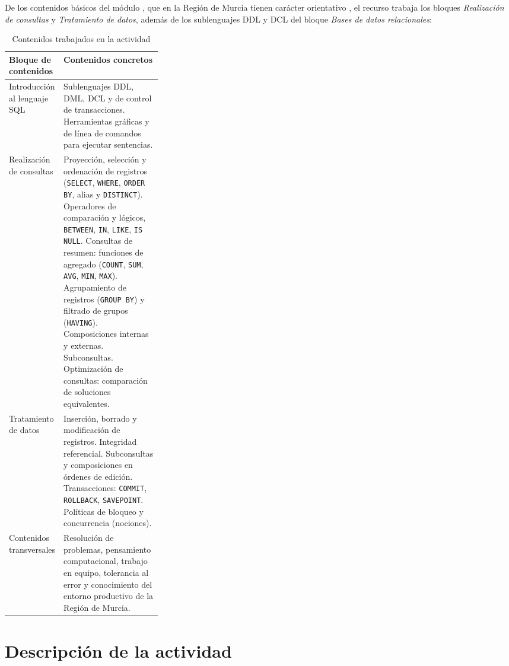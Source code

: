 \documentclass[11pt,a4paper]{article}
\begin{document}
De los contenidos básicos del módulo \cite{rd405}, que en la Región de Murcia tienen carácter
orientativo \cite[art.~3]{murcia2026}, el recurso trabaja los bloques \emph{Realización de
consultas} y \emph{Tratamiento de datos}, además de los sublenguajes DDL y DCL del bloque
\emph{Bases de datos relacionales}:

\begin{table}[H]
\centering
\begin{tabularx}{\linewidth}{@{}p{0.3\linewidth}X@{}}
\toprule
\textbf{Bloque de contenidos} & \textbf{Contenidos concretos} \\
\midrule
Introducción al lenguaje SQL &
Sublenguajes DDL, DML, DCL y de control de transacciones. Herramientas gráficas y de línea
de comandos para ejecutar sentencias. \\
\addlinespace
Realización de consultas &
Proyección, selección y ordenación de registros (\texttt{SELECT}, \texttt{WHERE},
\texttt{ORDER BY}, alias y \texttt{DISTINCT}). Operadores de comparación y lógicos,
\texttt{BETWEEN}, \texttt{IN}, \texttt{LIKE}, \texttt{IS NULL}. Consultas de resumen:
funciones de agregado (\texttt{COUNT}, \texttt{SUM}, \texttt{AVG}, \texttt{MIN},
\texttt{MAX}). Agrupamiento de registros (\texttt{GROUP BY}) y filtrado de grupos
(\texttt{HAVING}). Composiciones internas y externas. Subconsultas. Optimización de
consultas: comparación de soluciones equivalentes. \\
\addlinespace
Tratamiento de datos &
Inserción, borrado y modificación de registros. Integridad referencial. Subconsultas y
composiciones en órdenes de edición. Transacciones: \texttt{COMMIT}, \texttt{ROLLBACK},
\texttt{SAVEPOINT}. Políticas de bloqueo y concurrencia (nociones). \\
\addlinespace
Contenidos transversales &
Resolución de problemas, pensamiento computacional, trabajo en equipo, tolerancia al error
y conocimiento del entorno productivo de la Región de Murcia. \\
\bottomrule
\end{tabularx}
\caption{Contenidos trabajados en la actividad}
\end{table}

\section{Descripción de la actividad}
\end{document}
